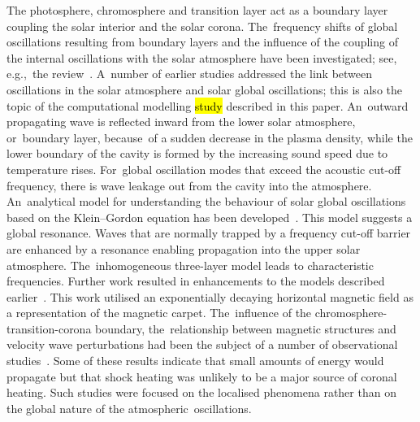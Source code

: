 \documentclass[physics,article,accept,pdftex,moreauthors]{Definitions/mdpi}
\begin{document}
 The photosphere, chromosphere and transition layer act as a boundary layer coupling the solar interior and the solar corona. The~frequency shifts of global oscillations resulting  from boundary layers   and the influence of the coupling of the internal oscillations with the solar atmosphere have been investigated; see, e.g.,~the review~\cite{Erdelyi2006}.  A~number of earlier studies addressed the link between oscillations in the solar atmosphere and solar global oscillations;  this is also the topic of the computational modelling 
\hl{study} 
described in this paper. An~outward propagating wave is reflected inward from the lower solar atmosphere, or~boundary layer, because~of a sudden decrease in the plasma density, while the lower boundary of the cavity is formed by the increasing sound speed due to temperature rises. For~global oscillation modes that exceed the acoustic cut-off frequency, there is wave leakage out from the cavity into the atmosphere. An~analytical model for understanding the behaviour of solar global oscillations based on the Klein--Gordon equation has been  developed~\cite{Taroyan2008}. This model suggests a global resonance. Waves  that are normally trapped by a frequency cut-off barrier are enhanced by a resonance enabling propagation into the upper solar atmosphere. The~inhomogeneous three-layer model leads to characteristic frequencies. Further work resulted in enhancements to the models described earlier~\cite{Pinter2007}.  This work utilised an exponentially decaying horizontal magnetic field as a representation of the magnetic carpet.  The~influence of the chromosphere-transition-corona boundary, the~relationship between magnetic structures and velocity wave perturbations had been the subject of a number of observational studies~\cite{Mein1976,Schmieder1980}. Some of these results indicate that small amounts of energy would propagate but that shock heating was unlikely to be a major source of coronal heating. Such studies were focused on the localised phenomena rather than on the global nature of the atmospheric~oscillations.
 
\end{document}

